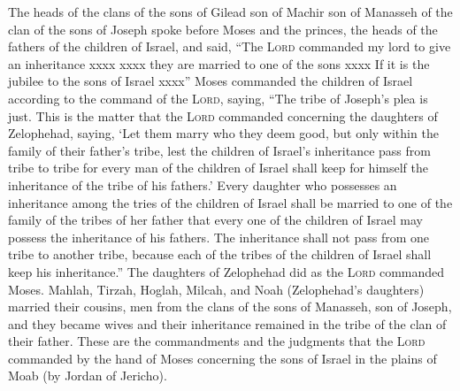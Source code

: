 
\begin{inparaenum}
     The heads of the clans of the sons of Gilead son of Machir son of Manasseh of the clan of the sons of Joseph spoke before Moses and the princes, the heads of the fathers of the children of Israel,%
     and said, ``The \textsc{Lord} commanded my lord to give an inheritance xxxx%
     xxxx they are married to one of the sons xxxx%
     If it is the jubilee to the sons of Israel xxxx''%
     Moses commanded the children of Israel according to the command of the \textsc{Lord}, saying, ``The tribe of Joseph's plea is just.%
     This is the matter that the \textsc{Lord} commanded concerning the daughters of Zelophehad, saying, `Let them marry who they deem good, but only within the family of their father's tribe,%
     lest the children of Israel's inheritance pass from tribe to tribe for every man of the children of Israel shall keep for himself the inheritance of the tribe of his fathers.'%
     Every daughter who possesses an inheritance among the tries of the children of Israel shall be married to one of the family of the tribes of her father that every one of the children of Israel may possess the inheritance of his fathers.%
     The inheritance shall not pass from one tribe to another tribe, because each of the tribes of the children of Israel shall keep his inheritance.''%
     The daughters of Zelophehad did as the \textsc{Lord} commanded Moses.%
     Mahlah, Tirzah, Hoglah, Milcah, and Noah (Zelophehad's daughters) married their cousins,%
     men from the clans of the sons of Manasseh, son of Joseph, and they became wives and their inheritance remained in the tribe of the clan of their father.%
     These are the commandments and the judgments that the \textsc{Lord} commanded by the hand of Moses concerning the sons of Israel in the plains of Moab (by Jordan of Jericho).%
\end{inparaenum}
